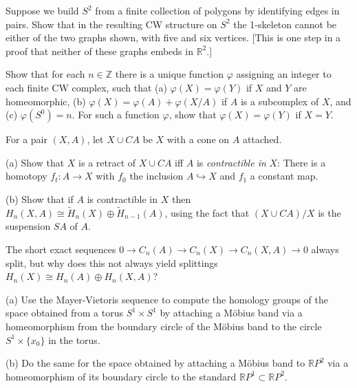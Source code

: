 \begin{exercise}
Suppose we build $S^2$ from a finite collection of polygons by identifying edges in pairs. Show that in the resulting CW structure on $S^2$ the 1-skeleton cannot be either of the two graphs shown, with five and six vertices. [This is one step in a proof that neither of these graphs embeds in $\mathbb{R}^2$.]


\end{exercise}

\begin{exercise}
Show that for each $n \in \mathbb{Z}$ there is a unique function $\varphi$ assigning an integer to each finite CW complex, such that (a) $\varphi(X) = \varphi(Y)$ if $X$ and $Y$ are homeomorphic, (b) $\varphi(X) = \varphi(A) + \varphi(X/A)$ if $A$ is a subcomplex of $X$, and (c) $\varphi(S^0) = n$. For such a function $\varphi$, show that $\varphi(X) = \varphi(Y)$ if $X = Y$.
\end{exercise}

\begin{exercise}
For a pair $(X,A)$, let $X \cup CA$ be $X$ with a cone on $A$ attached.

(a) Show that $X$ is a retract of $X \cup CA$ iff $A$ is \textit{contractible in} $X$: There is a homotopy $f_t: A \to X$ with $f_0$ the inclusion $A \hookrightarrow X$ and $f_1$ a constant map.

(b) Show that if $A$ is contractible in $X$ then $H_n(X,A) \cong \tilde{H}_n(X) \oplus \tilde{H}_{n-1}(A)$, using the fact that $(X \cup CA)/X$ is the suspension $SA$ of $A$.
\end{exercise}

\begin{exercise}
The short exact sequences $0 \to C_n(A) \to C_n(X) \to C_n(X,A) \to 0$ always split, but why does this not always yield splittings $H_n(X) \cong H_n(A) \oplus H_n(X,A)$?
\end{exercise}

\begin{exercise}
(a) Use the Mayer-Vietoris sequence to compute the homology groups of the space obtained from a torus $S^1 \times S^1$ by attaching a Möbius band via a homeomorphism from the boundary circle of the Möbius band to the circle $S^1 \times \{x_0\}$ in the torus.

(b) Do the same for the space obtained by attaching a Möbius band to $\mathbb{R}P^2$ via a homeomorphism of its boundary circle to the standard $\mathbb{R}P^1 \subset \mathbb{R}P^2$.
\end{exercise}

